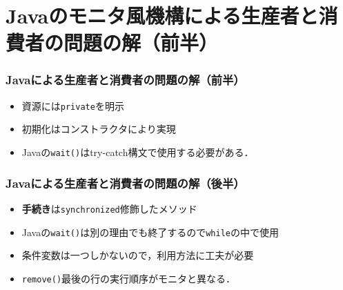 \documentclass[dvipdfmx]{beamer}
\begin{document}
\section{Javaのモニタ風機構による生産者と消費者の問題の解（前半）}
\begin{frame}
  \frametitle{Javaによる生産者と消費者の問題の解（前半）}
  

  \begin{itemize}
  \item 資源には{\tt private}を明示
  \item 初期化はコンストラクタにより実現
  \item Javaの{\tt wait()}はtry-catch構文で使用する必要がある．
  \end{itemize}
\end{frame}

\begin{frame}
  \frametitle{Javaによる生産者と消費者の問題の解（後半）}
  

  \begin{itemize}
  \item {\bf 手続き}は{\tt synchronized}修飾したメソッド
  \item Javaの{\tt wait()}は別の理由でも終了するので{\tt while}の中で使用
  \item 条件変数は一つしかないので，利用方法に工夫が必要
  \item {\tt remove()}最後の行の実行順序がモニタと異なる．
  \end{itemize}
\end{frame}
\end{document}
